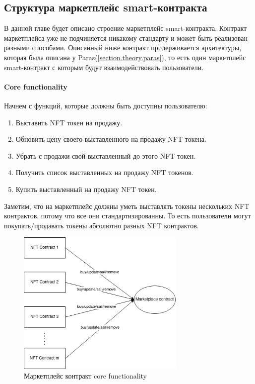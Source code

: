 \subsection{Структура маркетплейс smart-контракта}

В данной главе будет описано строение маркетплейс smart-контракта. Контракт маркетплейса уже не подчиняется никакому стандарту и может быть реализован разными способами.
Описанный ниже контракт придерживается архитектуры, которая была описана у Paras({\color{blue}\ref{section.theory.paras}}), то есть один маркетплейс smart-контракт с которым будут взаимодействовать пользователи.

\paragraph{Core functionality}

Начнем с функций, которые должны быть доступны пользователю:
\begin{enumerate}
    \item Выставить NFT токен на продажу.
    \item Обновить цену своего выставленного на продажу NFT токена.
    \item Убрать с продажи свой выставленный до этого NFT токен.
    \item Получить список выставленных на продажу NFT токенов.
    \item Купить выставленный на продажу NFT токен.
\end{enumerate}

Заметим, что на маркетплейс должны уметь выставлять токены нескольких NFT контрактов, потому что все они стандартизированны.
То есть пользователи могут покупать/продавать токены абсолютно разных NFT контрактов.

\begin{figure}[h!]
	\centering
	\includegraphics[height=70mm]{fig/marketplace.png}
	\caption{Маркетплейс контракт core functionality}
\end{figure}

